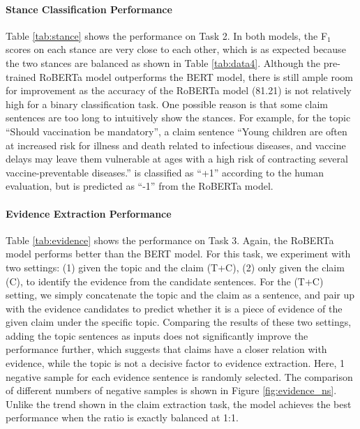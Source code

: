 \documentclass[11pt]{article}
\begin{document}
\paragraph{Stance Classification Performance}
Table \ref{tab:stance} shows the performance on Task 2.
In both models, the F$_1$ scores on each stance are very close to each other, which is as expected because the two stances are balanced as shown in Table \ref{tab:data4}.
Although the pre-trained RoBERTa model outperforms the BERT model, there is still ample room for improvement as the accuracy of the RoBERTa model (81.21) is not relatively high for a binary classification task.
One possible reason is that some claim sentences are too long to intuitively show the stances.
For example, for the topic ``Should vaccination be mandatory'', a claim sentence ``Young children are often at increased risk for illness and death related to infectious diseases, and vaccine delays may leave them vulnerable at ages with a high risk of contracting several vaccine-preventable diseases.'' is classified as ``+1'' according to the human evaluation, but is predicted as ``-1'' from the RoBERTa model.


















\paragraph{Evidence Extraction Performance}
Table \ref{tab:evidence} shows the performance on Task 3.
Again, the RoBERTa model performs better than the BERT model.
For this task, we experiment with two settings:
(1) given the topic and the claim (T+C), (2) only given the claim (C), to identify the evidence from the candidate sentences. 
For the (T+C) setting, we simply concatenate the topic and the claim as a sentence, and pair up with the evidence candidates to predict whether it is a piece of evidence of the given claim under the specific topic.
Comparing the results of these two settings, adding the topic sentences as inputs does not significantly improve the performance further, which suggests that claims have a closer relation with evidence, while the topic is not a decisive factor to evidence extraction.
Here, 1 negative sample for each evidence sentence is randomly selected.
The comparison of different numbers of negative samples is shown in Figure \ref{fig:evidence_ns}.
Unlike the trend shown in the claim extraction task, the model achieves the best performance when the ratio is exactly balanced at 1:1.
\end{document}

